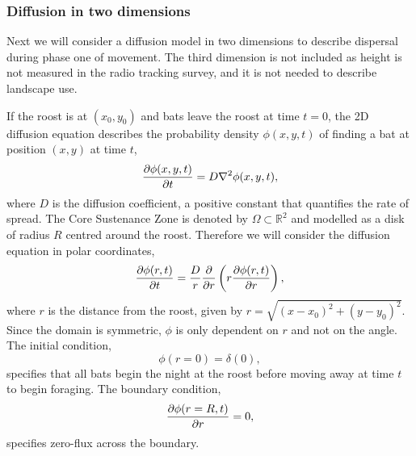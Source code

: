 \subsubsection{Diffusion in two dimensions}

Next we will consider a diffusion model in two dimensions to
describe dispersal during phase one of movement. The third dimension is not
included as height is not measured in the radio tracking survey, and it is not
needed to describe landscape use.

If the roost is at $(x_0,y_0)$ and bats leave the roost at time $t =0$,
the 2D diffusion equation describes the probability density $\phi(x,y,t)$ of
finding a bat at position $(x,y)$ at time $t$,
%
\begin{equation}
  \frac{\partial \phi(x,y,t)}{\partial t} = D \nabla^2 \phi(x,y,t) ,
  \label{eqn:diffusion_cartesian2d}
\end{equation}
%
where $D$ is the diffusion coefficient, a positive constant that quantifies the
 rate of spread. The Core Sustenance Zone is denoted by $\Omega \subset \mathbb{R}^2$ and modelled as a disk of radius $R$ centred around the roost. Therefore we will consider the diffusion equation in polar coordinates,
 \begin{equation}
 \frac{\partial  \phi(r,t)}{\partial t} = \frac{D}{r} \frac{\partial }{\partial  r} \left( r \frac{\partial \phi(r,t)}{\partial r} \right),
 \label{eqn:diffusion_polar2d}
 \end{equation}
 where $r$ is the distance from the roost, given by $r=\sqrt{(x-x_0)^2 +
 (y-y_0)^2}$. Since the domain is symmetric, $\phi$ is only dependent on $r$ and not
  on the angle. The initial condition,
%
 \begin{equation}
 \phi(r = 0) = \delta(0),
 \label{eqn:IC2d}
 \end{equation}
%
specifies that all bats begin the night at the roost before moving away at time $t$ to begin foraging. The boundary condition,
%
\begin{equation}
\frac{\partial \phi(r=R,t)}{\partial r} = 0,
\label{eqn:BC}
\end{equation}
%
specifies zero-flux across the boundary.

